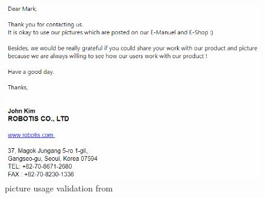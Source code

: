 \begin{figure}[H]
    \centering
    \includegraphics{Figures/Technical_figures/ROBOtisPERM.PNG}
    \caption{picture usage validation from \cite{PIDmxx}}
\end{figure}